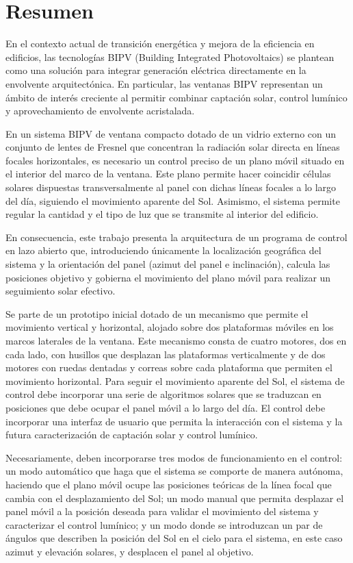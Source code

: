 \chapter{Resumen}
En el contexto actual de transición energética y mejora de la eficiencia en edificios, las tecnologías BIPV (Building Integrated Photovoltaics) se plantean como una solución para integrar generación eléctrica directamente en la envolvente arquitectónica. En particular, las ventanas BIPV representan un ámbito de interés creciente al permitir combinar captación solar, control lumínico y aprovechamiento de envolvente acristalada. 

En un sistema BIPV de ventana compacto dotado de un vidrio externo con un conjunto de lentes de Fresnel que concentran la radiación solar directa en líneas focales horizontales, es necesario un control preciso de un plano móvil situado en el interior del marco de la ventana. Este plano permite hacer coincidir células solares dispuestas transversalmente al panel con dichas líneas focales a lo largo del día, siguiendo el movimiento aparente del Sol. Asimismo, el sistema permite regular la cantidad y el tipo de luz que se transmite al interior del edificio.

En consecuencia, este trabajo presenta la arquitectura de un programa de control en lazo abierto que, introduciendo únicamente la localización geográfica del sistema y la orientación del panel (azimut del panel e inclinación), calcula las posiciones objetivo y gobierna el movimiento del plano móvil para realizar un seguimiento solar efectivo. 

Se parte de un prototipo inicial dotado de un mecanismo que permite el movimiento vertical y horizontal, alojado sobre dos plataformas móviles en los marcos laterales de la ventana. Este mecanismo consta de cuatro motores, dos en cada lado, con husillos que desplazan las plataformas verticalmente y de dos motores con ruedas dentadas y correas sobre cada plataforma que permiten el movimiento horizontal. Para seguir el movimiento aparente del Sol, el sistema de control debe incorporar una serie de algoritmos solares que se traduzcan en posiciones que debe ocupar el panel móvil a lo largo del día. El control debe incorporar una interfaz de usuario que permita la interacción con el sistema y la futura caracterización de captación solar y control lumínico.

Necesariamente, deben incorporarse tres modos de funcionamiento en el control: un modo automático que haga que el sistema se comporte de manera autónoma, haciendo que el plano móvil ocupe las posiciones teóricas de la línea focal que cambia con el desplazamiento del Sol; un modo manual que permita desplazar el panel móvil a la posición deseada para validar el movimiento del sistema y caracterizar el control lumínico; y un modo donde se introduzcan un par de ángulos que describen la posición del Sol en el cielo para el sistema, en este caso azimut y elevación solares, y desplacen el panel al objetivo.

